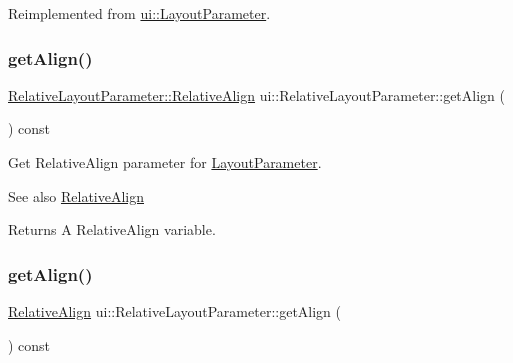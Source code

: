 Reimplemented from \hyperlink{classui_1_1LayoutParameter_a6ca908e0dd4f85238894b28d5d816974}{ui\+::\+Layout\+Parameter}.

\mbox{\label{classui_1_1RelativeLayoutParameter_ad4cdf1f742c39831440047ae90ad9160}} 
\subsubsection{\texorpdfstring{get\+Align()}{getAlign()}\hspace{0.1cm}{\footnotesize\ttfamily [1/2]}}
{\footnotesize\ttfamily \hyperlink{classui_1_1RelativeLayoutParameter_a40283d09524c58e61741de3288e6769d}{Relative\+Layout\+Parameter\+::\+Relative\+Align} ui\+::\+Relative\+Layout\+Parameter\+::get\+Align (\begin{DoxyParamCaption}{ }\end{DoxyParamCaption}) const}

Get Relative\+Align parameter for \hyperlink{classui_1_1LayoutParameter}{Layout\+Parameter}.

\begin{DoxySeeAlso}{See also}
\hyperlink{classui_1_1RelativeLayoutParameter_a40283d09524c58e61741de3288e6769d}{Relative\+Align} 
\end{DoxySeeAlso}
\begin{DoxyReturn}{Returns}
A Relative\+Align variable. 
\end{DoxyReturn}
\mbox{\label{classui_1_1RelativeLayoutParameter_a1b2a2308ca06248641853062be1cb55b}} 
\subsubsection{\texorpdfstring{get\+Align()}{getAlign()}\hspace{0.1cm}{\footnotesize\ttfamily [2/2]}}
{\footnotesize\ttfamily \hyperlink{classui_1_1RelativeLayoutParameter_a40283d09524c58e61741de3288e6769d}{Relative\+Align} ui\+::\+Relative\+Layout\+Parameter\+::get\+Align (\begin{DoxyParamCaption}{ }\end{DoxyParamCaption}) const}

